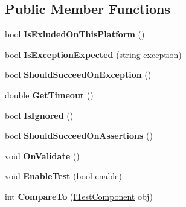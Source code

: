 \subsection*{Public Member Functions}
\begin{DoxyCompactItemize}
\item 
\mbox{\label{class_unity_test_1_1_test_component_a6d4a668575c1a4cabe249a8a99de6d34}} 
bool {\bfseries Is\+Exluded\+On\+This\+Platform} ()
\item 
\mbox{\label{class_unity_test_1_1_test_component_af1bb98d96500b0d8c475d0d72d0bcc65}} 
bool {\bfseries Is\+Exception\+Expected} (string exception)
\item 
\mbox{\label{class_unity_test_1_1_test_component_a6611e874002d7ca31fce2cdf43b77a3b}} 
bool {\bfseries Should\+Succeed\+On\+Exception} ()
\item 
\mbox{\label{class_unity_test_1_1_test_component_a9f0e9f51090fd1cf4b4a0e1dfc4a2f62}} 
double {\bfseries Get\+Timeout} ()
\item 
\mbox{\label{class_unity_test_1_1_test_component_a05340945a236f267aa31ade6dbb40c61}} 
bool {\bfseries Is\+Ignored} ()
\item 
\mbox{\label{class_unity_test_1_1_test_component_aecbe6f7b0aaf3a519002cc91b86c74be}} 
bool {\bfseries Should\+Succeed\+On\+Assertions} ()
\item 
\mbox{\label{class_unity_test_1_1_test_component_ace06ed056058dbdcf5f86dfc06539dcc}} 
void {\bfseries On\+Validate} ()
\item 
\mbox{\label{class_unity_test_1_1_test_component_aada8d47d6868618db60222ebfc28fbca}} 
void {\bfseries Enable\+Test} (bool enable)
\item 
\mbox{\label{class_unity_test_1_1_test_component_aaa79f78b005b858741dfb853114a5c6c}} 
int {\bfseries Compare\+To} (\hyperlink{interface_unity_test_1_1_i_test_component}{I\+Test\+Component} obj)

\end{DoxyCompactItemize}
